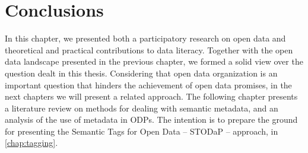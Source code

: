 \section{Conclusions}
\label{dl_conclusion} 

In this chapter, we presented both a participatory research on open data and theoretical and practical contributions to data literacy.
Together with the open data landscape presented in the previous chapter, we formed a solid view over the question dealt in this thesis. 
Considering that open data organization is an important question that hinders the achievement of open data promises, in the next chapters we will present a related approach.
The following chapter presents a literature review on methods for dealing with semantic metadata, and an analysis of the use of metadata in ODPs. 
The intention is to prepare the ground for presenting the Semantic Tags for Open Data -- STODaP -- approach, in \autoref{chap:tagging}.

